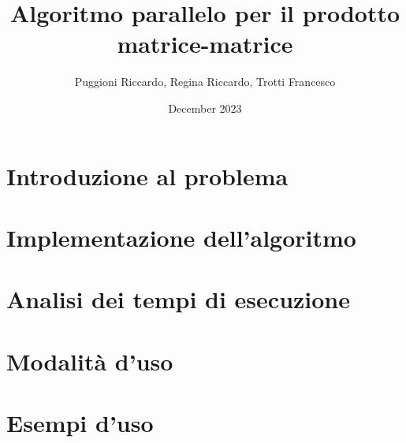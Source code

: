 \documentclass{article}
\title{Algoritmo parallelo per il prodotto matrice-matrice}
\author{Puggioni Riccardo, Regina Riccardo, Trotti Francesco }
\date{December 2023}
\begin{document}
\maketitle

\newpage
\tableofcontents

\newpage
\section{Introduzione al problema}
    

\section{Implementazione dell'algoritmo}
    

\section{Analisi dei tempi di esecuzione}
    

\section{Modalità d'uso}
    

\section{Esempi d'uso}
\end{document}
